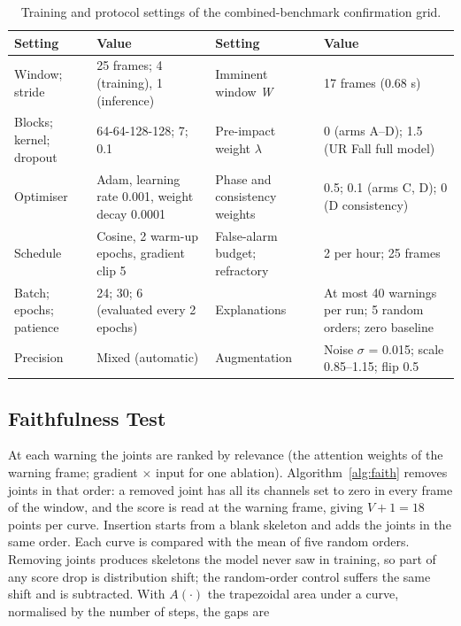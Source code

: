 \documentclass[journal]{IEEEtran}
\begin{document}
\begin{table}[!t]
\renewcommand{\arraystretch}{1.15}
\caption{Training and protocol settings of the combined-benchmark confirmation grid.}
\label{tab:settings}
\centering
\footnotesize
\begin{tabular}{p{}p{}p{}p{}}
\hline
Setting & Value & Setting & Value \\
\hline
Window; stride & 25 frames; 4 (training), 1 (inference) & Imminent window \textit{W} & 17 frames (0.68 s) \\
Blocks; kernel; dropout & 64-64-128-128; 7; 0.1 & Pre-impact weight $\lambda$ & 0 (arms A--D); 1.5 (UR Fall full model) \\
Optimiser & Adam, learning rate 0.001, weight decay 0.0001 & Phase and consistency weights & 0.5; 0.1 (arms C, D); 0 (D consistency) \\
Schedule & Cosine, 2 warm-up epochs, gradient clip 5 & False-alarm budget; refractory & 2 per hour; 25 frames \\
Batch; epochs; patience & 24; 30; 6 (evaluated every 2 epochs) & Explanations & At most 40 warnings per run; 5 random orders; zero baseline \\
Precision & Mixed (automatic) & Augmentation & Noise $\sigma$ = 0.015; scale 0.85--1.15; flip 0.5 \\
\hline
\end{tabular}
\end{table}


\subsection{Faithfulness Test}\label{sub:ftest}

At each warning the joints are ranked by relevance (the attention weights of the warning frame; gradient $\times$ input for one ablation). Algorithm~\ref{alg:faith} removes joints in that order: a removed joint has all its channels set to zero in every frame of the window, and the score is read at the warning frame, giving $V+1=18$ points per curve. Insertion starts from a blank skeleton and adds the joints in the same order. Each curve is compared with the mean of five random orders. Removing joints produces skeletons the model never saw in training, so part of any score drop is distribution shift; the random-order control suffers the same shift and is subtracted. With $A(\cdot)$ the trapezoidal area under a curve, normalised by the number of steps, the gaps are
\end{document}
